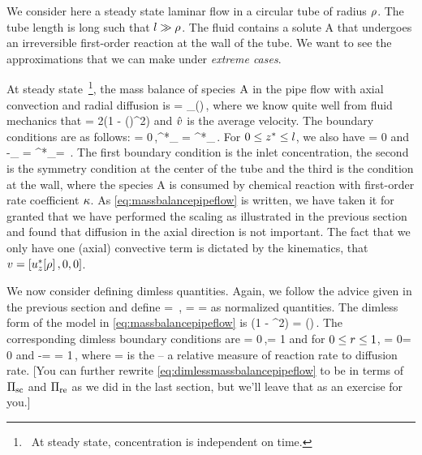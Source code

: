 We consider here a steady state laminar flow in a circular tube of radius $\rho$. The tube length is long such that $l\gg\rho$. The fluid contains a solute \ce A that undergoes an irreversible first-order reaction at the wall of the tube. We want to see the approximations that we can make under \emph{extreme cases}.

At steady state~\footnote{~At steady state, concentration is independent on time.}, the mass balance of species $\ce A$ in the pipe flow with axial convection and radial diffusion is
\bneq\label{eq:massbalancepipeflow}
\vela{} = \kmdiff_{}\left(\xpd{}{\posr}{\posr}\right)\,,
\eneq
where we know quite well from fluid mechanics that
\beq
\vela = 2\hat{\lvel}\left(1 - \left(\dfrac{\posr}{\rradius}\right)^2\right)
\eeq
and $\hat{v}$ is the average velocity. The boundary conditions are as follows:
\bneq\label{eq:boundaryconditionsmassbalancepipeflow}
 \posz = 0\,,\quad\conc^*_{} = \conc^*_{}\quad{}\posr\rradius\,.
\eneq
For ${0}\leq{z^*}\leq{l}$, we also have
\beq
{}\quad{}\posr = 0
\eeq
and
\beq
-\kmdiff_{} = \kforcoeff\conc^*_{}\quad{}\posr = \rradius\,.
\eeq
The first boundary condition is the inlet concentration, the second is the symmetry condition at the center of the tube and the third is the condition at the wall, where the species \ce A is consumed by chemical reaction with first-order rate coefficient $\kappa$. As \cref{eq:massbalancepipeflow} is written, we have taken it for granted that we have performed the scaling as illustrated in the previous section and found that diffusion in the axial direction is not important. The fact that we only have one (axial) convective term is dictated by the kinematics, that $v = \left[{u^*_z\!\left[{\rho}\right],0,0}\right]$.

We now consider defining dimless quantities. Again, we follow the advice given in the previous section and define
\beq
\conc = \,,\quad
\ndposr = \dfrac{\posr}{\rradius}\quad{}\quad
\ndposz = \dfrac{\posz}{\length}
\eeq
as normalized quantities. The dimless form of the model in \cref{eq:massbalancepipeflow} is
\bneq\label{eq:dimlessmassbalancepipeflow}
\left(1 - \ndposr^2\right) \xpd{\conc}{\ndposz} = 
    \left(\xpd{}\ndposr\ndposr\xpd\conc\ndposr\right)\,.
\eneq
The corresponding dimless boundary conditions are
\beq
{}\ndposz = 0\,,\quad\conc = 1\quad{}
\eeq
and for ${0}\leq{r}\leq{1}$,
\beq
\xpd\conc\ndposr = 0\quad{}\ndposr = 0
\eeq
and
\bneq\label{eq:dimlessconcentrationgradient}
-\xpd\conc\ndposr = \kdamkohler\conc\quad{}\ndposr = 1\,,
\eneq
where
\beq
\kdamkohler = 
\eeq
is the  -- a relative measure of reaction rate to diffusion rate. [You can further rewrite \cref{eq:dimlessmassbalancepipeflow} to be in terms of $\Pi_\text{sc}$ and $\Pi_\text{re}$ as we did in the last section, but we'll leave that as an exercise for you.]

